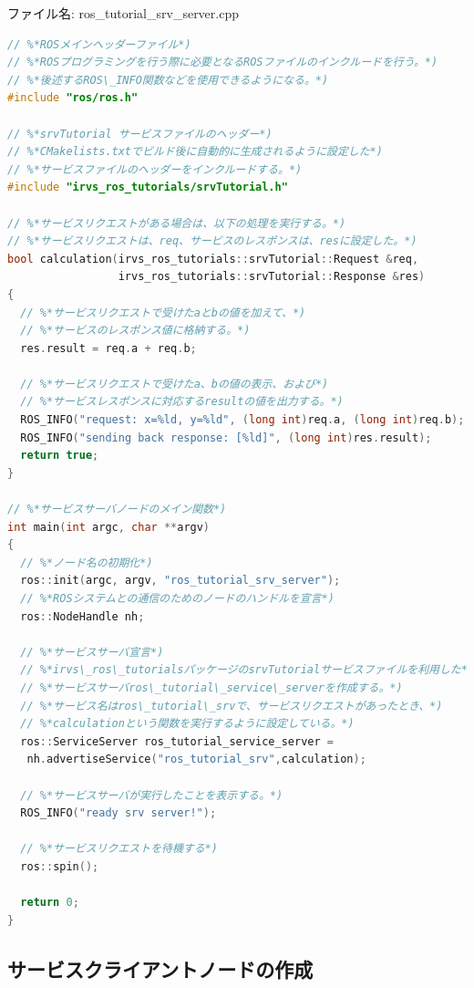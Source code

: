 ファイル名: ros\_tutorial\_srv\_server.cpp
\begin{lstlisting}[language=C++]
// %*ROSメインヘッダーファイル*)
// %*ROSプログラミングを行う際に必要となるROSファイルのインクルードを行う。*)
// %*後述するROS\_INFO関数などを使用できるようになる。*)
#include "ros/ros.h"

// %*srvTutorial サービスファイルのヘッダー*)
// %*CMakelists.txtでビルド後に自動的に生成されるように設定した*)
// %*サービスファイルのヘッダーをインクルードする。*)
#include "irvs_ros_tutorials/srvTutorial.h"

// %*サービスリクエストがある場合は、以下の処理を実行する。*)
// %*サービスリクエストは、req、サービスのレスポンスは、resに設定した。*)
bool calculation(irvs_ros_tutorials::srvTutorial::Request &req,
                 irvs_ros_tutorials::srvTutorial::Response &res)
{
  // %*サービスリクエストで受けたaとbの値を加えて、*)
  // %*サービスのレスポンス値に格納する。*)
  res.result = req.a + req.b;

  // %*サービスリクエストで受けたa、bの値の表示、および*)
  // %*サービスレスポンスに対応するresultの値を出力する。*)
  ROS_INFO("request: x=%ld, y=%ld", (long int)req.a, (long int)req.b);
  ROS_INFO("sending back response: [%ld]", (long int)res.result);
  return true;
}

// %*サービスサーバノードのメイン関数*)
int main(int argc, char **argv)
{
  // %*ノード名の初期化*)
  ros::init(argc, argv, "ros_tutorial_srv_server");
  // %*ROSシステムとの通信のためのノードのハンドルを宣言*)
  ros::NodeHandle nh;

  // %*サービスサーバ宣言*)
  // %*irvs\_ros\_tutorialsパッケージのsrvTutorialサービスファイルを利用した*)
  // %*サービスサーバros\_tutorial\_service\_serverを作成する。*)
  // %*サービス名はros\_tutorial\_srvで、サービスリクエストがあったとき、*)
  // %*calculationという関数を実行するように設定している。*)
  ros::ServiceServer ros_tutorial_service_server =
   nh.advertiseService("ros_tutorial_srv",calculation);

  // %*サービスサーバが実行したことを表示する。*)
  ROS_INFO("ready srv server!");

  // %*サービスリクエストを待機する*)
  ros::spin();

  return 0;
}
\end{lstlisting}

\subsection{サービスクライアントノードの作成}

